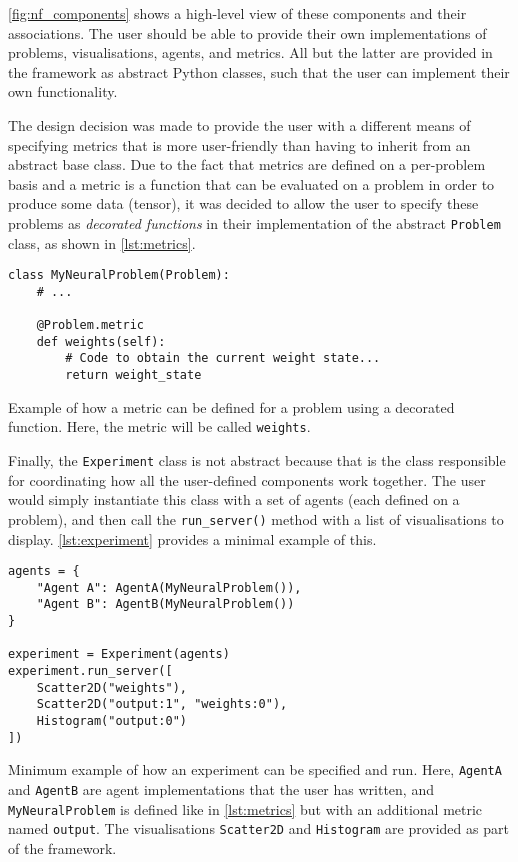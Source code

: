 \ref{fig:nf_components} shows a high-level view of these components and their associations. 
The user should be able to provide their own implementations of problems, visualisations, agents, and metrics. 
All but the latter are provided in the framework as abstract Python classes, such that the user can implement their own functionality.

The design decision was made to provide the user with a different means of specifying metrics that is more user-friendly than having to inherit from an abstract base class.
Due to the fact that metrics are defined on a per-problem basis and a metric is a function that can be evaluated on a problem in order to produce some data (tensor), it was decided to allow the user to specify these problems as \textit{decorated functions} in their implementation of the abstract \texttt{Problem} class, as shown in \ref{lst:metrics}.
\begin{listing}[h]
\begin{verbatim}
class MyNeuralProblem(Problem):
    # ...
    
    @Problem.metric
    def weights(self):
        # Code to obtain the current weight state...
        return weight_state
\end{verbatim}
\caption{Example of how a metric can be defined for a problem using a decorated function. Here, the metric will be called \texttt{weights}.}
\label{lst:metrics}
\end{listing}

Finally, the \texttt{Experiment} class is not abstract because that is the class responsible for coordinating how all the user-defined components work together.
The user would simply instantiate this class with a set of agents (each defined on a problem), and then call the \texttt{run\_server()} method with a list of visualisations to display. \ref{lst:experiment} provides a minimal example of this.
\begin{listing}[h]
\begin{verbatim}
agents = {
    "Agent A": AgentA(MyNeuralProblem()),
    "Agent B": AgentB(MyNeuralProblem())
}

experiment = Experiment(agents)
experiment.run_server([
    Scatter2D("weights"),
    Scatter2D("output:1", "weights:0"),
    Histogram("output:0")
])
\end{verbatim}
\caption{Minimum example of how an experiment can be specified and run. Here, \texttt{AgentA} and \texttt{AgentB} are agent implementations that the user has written, and \texttt{MyNeuralProblem} is defined like in \ref{lst:metrics} but with an additional metric named \texttt{output}. The visualisations \texttt{Scatter2D} and \texttt{Histogram} are provided as part of the framework.}
\label{lst:experiment}
\end{listing}

